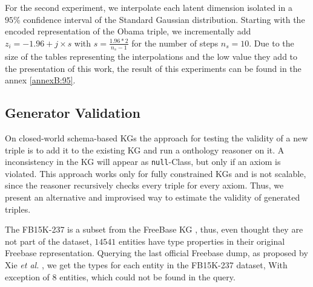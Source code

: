 For the second experiment, we interpolate each latent dimension isolated in a $95\%$ confidence interval of the Standard Gaussian distribution. Starting with the encoded representation of the Obama triple, we incrementally add $z_{i} = -1.96 + j \times s$ with $s = \frac{1.96 * 2}{n_s-1}$ for the number of steps $n_s = 10$. Due to the size of the tables representing the interpolations and the low value they add to the presentation of this work, the result of this experiments can be found in the annex \ref{annexB:95}.





\subsection{Generator Validation}
\label{ssec5:syntax}

On closed-world schema-based KGs the approach for testing the validity of a new triple is to add it to the existing KG and run a onthology reasoner on it. A inconsistency in the KG will appear as \texttt{null}-Class, but only if an axiom is violated. This approach works only for fully constrained KGs and is not scalable, since the reasoner recursively checks every triple for every axiom. Thus, we present an alternative and improvised way to estimate the validity of generated triples.

The FB15K-237 is a subset from the FreeBase KG \cite{bollacker_freebase_2008}, thus, even thought they are not part of the dataset, $14541$ entities have type properties in their original Freebase representation. 
Querying the last official Freebase dump, as proposed by Xie \textit{et al.} \cite{xie2016representation}, we get the types for each entity in the FB15K-237 dataset, With exception of $8$ entities, which could not be found in the query.

